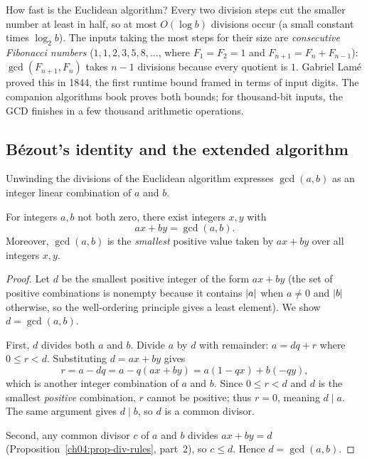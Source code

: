 \begin{connectionbox}
How fast is the Euclidean algorithm? Every two division steps cut the smaller number at least in
half, so at most $O(\log b)$ divisions occur (a small constant times $\log_2 b$). The inputs taking
the most steps for their size are \emph{consecutive Fibonacci numbers} ($1, 1, 2, 3, 5, 8, \dots$,
where $F_1 = F_2 = 1$ and $F_{n+1} = F_n + F_{n-1}$): $\gcd(F_{n+1}, F_n)$ takes $n - 1$ divisions
because every quotient is $1$. Gabriel Lam\'e proved this in 1844, the first runtime bound framed
in terms of input digits. The companion algorithms book proves both bounds; for thousand-bit
inputs, the GCD finishes in a few thousand arithmetic operations.
\end{connectionbox}

\subsection*{B\'ezout's identity and the extended algorithm}

Unwinding the divisions of the Euclidean algorithm expresses $\gcd(a, b)$ as an integer linear
combination of $a$ and $b$.

\begin{theorem}
\label{ch04:thm-bezout}
For integers $a, b$ not both zero, there exist integers $x, y$ with
\[
  ax + by = \gcd(a, b).
\]
Moreover, $\gcd(a,b)$ is the \emph{smallest} positive value taken by $ax + by$ over all integers
$x, y$.
\end{theorem}

\begin{proof}
Let $d$ be the smallest positive integer of the form $ax + by$ (the set of positive combinations is
nonempty because it contains $\lvert a\rvert$ when $a \neq 0$ and $\lvert b\rvert$ otherwise, so the
well-ordering principle gives a least element). We show $d = \gcd(a, b)$.

First, $d$ divides both $a$ and $b$. Divide $a$ by $d$ with remainder: $a = dq + r$ where
$0 \le r < d$. Substituting $d = ax + by$ gives
\[
  r = a - dq = a - q(ax + by) = a(1 - qx) + b(-qy),
\]
which is another integer combination of $a$ and $b$. Since $0 \le r < d$ and $d$ is the smallest
\emph{positive} combination, $r$ cannot be positive; thus $r = 0$, meaning $d \mid a$. The same
argument gives $d \mid b$, so $d$ is a common divisor.

Second, any common divisor $c$ of $a$ and $b$ divides $ax + by = d$
(Proposition~\ref{ch04:prop-div-rules}, part~2), so $c \le d$. Hence $d = \gcd(a, b)$.
\end{proof}

